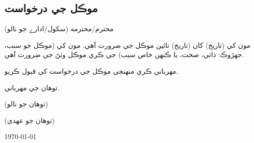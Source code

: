 \documentclass[sindhi, 12pt]{article}
\begin{document}
\begin{center}
\section*{
موڪل جي درخواست
}
\end{center}


\vspace{2cm}
محترم/محترمه (سکول/ادارے جو نالو)

\vspace{0.5cm}
مون کي (تاريخ) کان (تاريخ) تائين موڪل جي ضرورت آهي. مون کي (موڪل جو سبب، جهڙوڪ: ذاتي، صحت، يا ڪنهن خاص سبب) جي ڪري موڪل وٺڻ جي ضرورت آهي.

\vspace{0.5cm}
مهرباني ڪري منهنجي موڪل جي درخواست کي قبول ڪريو.

\vspace{0.5cm}
\hspace{6cm}
توهان جي مهرباني.

\vspace{2cm}
\hfill
(توهان جو نالو)

\hfill
(توهان جو عهدي)

\hfill
\today
\end{document}
